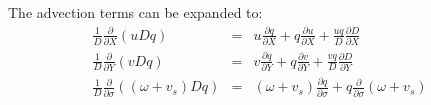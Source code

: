 The advection terms can be expanded to:
\begin{eqnarray}
\frac{1}{D}\frac{\partial }{\partial X} \left(uDq\right) &=&
 u\frac{\partial q}{\partial X} + q\frac{\partial u}{\partial X} + \frac{uq}{D} \frac{\partial D}{\partial X} \label{AdvTopo2X}\\
\frac{1}{D}\frac{\partial }{\partial Y} \left(vDq\right) &=&
 v\frac{\partial q}{\partial Y} + q\frac{\partial v}{\partial Y} + \frac{vq}{D} \frac{\partial D}{\partial Y} \\
\frac{1}{D}\frac{\partial }{\partial \sigma} \left(\left( \omega + v_s \right)Dq\right) &=&
 \left( \omega + v_s \right)\frac{\partial q}{\partial \sigma} + q\frac{\partial }{\partial \sigma}\left( \omega + v_s \right)
\end{eqnarray}


